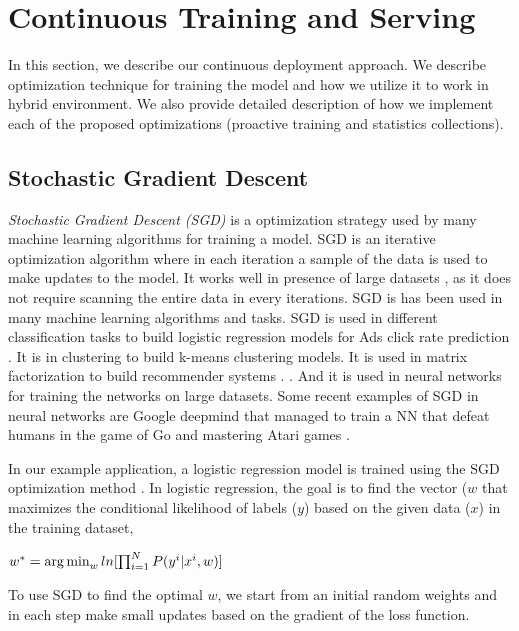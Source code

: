 \section{Continuous Training and Serving} \label{continuous-training-serving}
In this section, we describe our continuous deployment approach.
We describe optimization technique for training the model and how we utilize it to work in hybrid environment.
We also provide detailed description of how we implement each of the proposed optimizations (proactive training and statistics collections).

\subsection{Stochastic Gradient Descent} \label{sgd}
\textit{Stochastic Gradient Descent (SGD) } is a optimization strategy used by many machine learning algorithms for training a model.
SGD is an iterative optimization algorithm where in each iteration a sample of the data is used to make updates to the model.
It works well in presence of large datasets \cite{bottou2010large}, as it does not require scanning the entire data in every iterations.
SGD is has been used in many machine learning algorithms and tasks.
SGD is used in different classification \cite{zhang2004solving} tasks to build logistic regression models for Ads click rate prediction \cite{macmahan2013}.
It is in clustering \cite{bottou1995convergence} to build k-means clustering models.
It is used in matrix factorization \cite{funk2006netflix} to build recommender systems  \cite{koren2009matrix}. .
And it is used in neural networks \cite{dean2012large} for training the networks on large datasets.
Some recent examples of SGD in neural networks are Google deepmind that managed to train a NN that defeat humans in the game of Go  \cite{silver2016mastering} and mastering Atari games \cite{mnih2013playing} .

In our example application, a logistic regression model is trained using the SGD optimization method \cite{macmahan2013}.
In logistic regression, the goal is to find the vector ($w$ that maximizes the conditional likelihood of labels ($y$) based on the given data ($x$) in the training dataset,

$w^* = \operatorname*{arg\,min}_w ln[\prod_{i=1}^{N} P(y^i | x^i, w)]$

To use SGD to find the optimal $w$, we start from an initial random weights and in each step make small updates based on the gradient of the loss function. 

